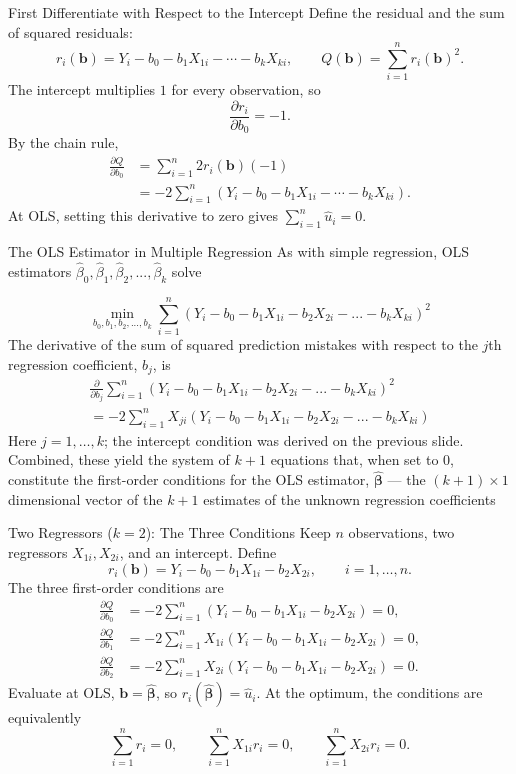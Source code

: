 \documentclass[notes,10pt, aspectratio=169]{beamer}
\begin{document}
\begin{frame}{First Differentiate with Respect to the Intercept}
\footnotesize
Define the residual and the sum of squared residuals:
\[
r_i(\bm{b})=Y_i-b_0-b_1X_{1i}-\cdots-b_kX_{ki},\qquad
Q(\bm{b})=\sum_{i=1}^{n}r_i(\bm{b})^2.
\]
The intercept multiplies $1$ for every observation, so
\[
\frac{\partial r_i}{\partial b_0}=-1.
\]
By the chain rule,
\[
\begin{aligned}
\frac{\partial Q}{\partial b_0}
&=\sum_{i=1}^{n}2r_i(\bm{b})(-1)\\
&=-2\sum_{i=1}^{n}(Y_i-b_0-b_1X_{1i}-\cdots-b_kX_{ki}).
\end{aligned}
\]
At OLS, setting this derivative to zero gives $\sum_{i=1}^{n}\hat{u}_i=0$.
\end{frame}

\begin{frame}{The OLS Estimator in Multiple Regression}
As with simple regression, OLS estimators $\hat{\beta}_0, \hat{\beta}_1, \hat{\beta}_2, ... , \hat{\beta}_k$ solve

\begin{equation*}
    \min_{b_0, b_1, b_2, ..., b_k} \sum_{i=1}^n (Y_i - b_0 - b_1 X_{1i}- b_2 X_{2i}-...- b_k X_{ki})^2
\end{equation*}
The derivative of the sum of squared prediction mistakes with respect to the $j$th regression coefficient, $b_j$, is
\begin{eqnarray*}
    \frac{\partial}{\partial b_j} \sum_{i=1}^n (Y_i - b_0 - b_1 X_{1i}- b_2 X_{2i}-...- b_k X_{ki})^2\\
    = -2 \sum_{i=1}^n X_{ji} (Y_i - b_0 - b_1 X_{1i}- b_2 X_{2i}-...- b_k X_{ki})
\end{eqnarray*}
Here $j=1,\ldots,k$; the intercept condition was derived on the previous slide.
Combined, these yield the system of $k+1$ equations that, when set to 0, constitute the first-order conditions for the OLS estimator, $\bm{\hat{\beta}}$ --- the $(k+1)\times1$ dimensional vector of the $k+1$ estimates of the unknown regression coefficients

\end{frame}


\begin{frame}{Two Regressors ($k=2$): The Three Conditions}
\footnotesize
Keep $n$ observations, two regressors $X_{1i},X_{2i}$, and an intercept. Define
\[
r_i(\bm{b})=Y_i-b_0-b_1X_{1i}-b_2X_{2i},\qquad i=1,\ldots,n.
\]
The three first-order conditions are
\[
\begin{aligned}
\frac{\partial Q}{\partial b_0}&=-2\sum_{i=1}^{n}(Y_i-b_0-b_1X_{1i}-b_2X_{2i})=0,\\
\frac{\partial Q}{\partial b_1}&=-2\sum_{i=1}^{n}X_{1i}(Y_i-b_0-b_1X_{1i}-b_2X_{2i})=0,\\
\frac{\partial Q}{\partial b_2}&=-2\sum_{i=1}^{n}X_{2i}(Y_i-b_0-b_1X_{1i}-b_2X_{2i})=0.
\end{aligned}
\]
Evaluate at OLS, $\bm{b}=\bm{\hat{\beta}}$, so $r_i(\bm{\hat{\beta}})=\hat{u}_i$.
At the optimum, the conditions are equivalently
\[
\sum_{i=1}^{n}r_i=0,\qquad
\sum_{i=1}^{n}X_{1i}r_i=0,\qquad
\sum_{i=1}^{n}X_{2i}r_i=0.
\]
\end{frame}
\end{document}
